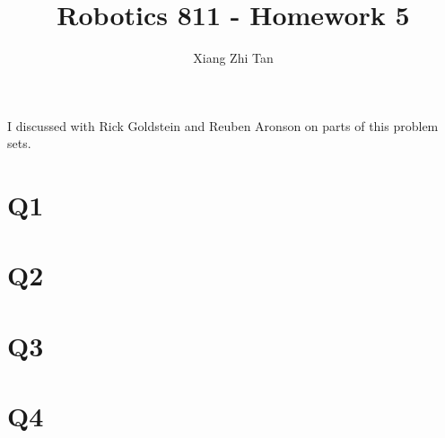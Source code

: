 \documentclass{article}
\begin{document}
\title{Robotics 811 - Homework 5}
\author{Xiang Zhi Tan}
\maketitle
I discussed with Rick Goldstein and Reuben Aronson on parts of this problem sets.
\section{Q1}

\section{Q2}

\section{Q3}

\section{Q4}

\end{document}
